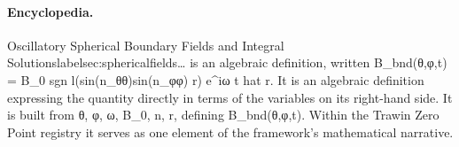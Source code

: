 \paragraph{Encyclopedia.}
Oscillatory Spherical Boundary Fields and Integral Solutionslabelsec:sphericalfields… is an algebraic definition, written B\_bnd(θ,φ,t) = B\_0 sgn l(sin(n\_θθ)sin(n\_φφ) r) e\textasciicircum{}iω t hat r. It is an algebraic definition expressing the quantity directly in terms of the variables on its right-hand side. It is built from θ, φ, ω, B\_0, n, r, defining B\_bnd(θ,φ,t). Within the Trawin Zero Point registry it serves as one element of the framework's mathematical narrative.

